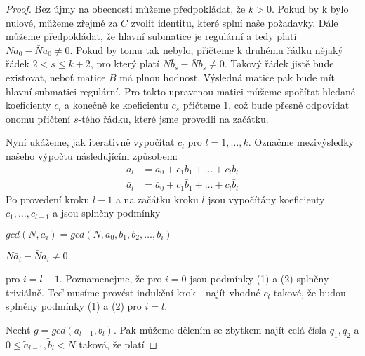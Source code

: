 \begin{proof}
Bez újmy na obecnosti můžeme předpokládat, že $ k > 0 $. Pokud by k bylo nulové,
můžeme zřejmě za $ C $ zvolit identitu, které splní naše požadavky.
Dále můžeme předpokládat, že hlavní submatice je regulární a tedy platí
$ N \bar{a}_0 - \bar{N} a_0 \neq 0 $. Pokud by tomu tak nebylo, přičteme k druhému
řádku nějaký řádek $ 2 < s \leq k + 2 $, pro který platí
$ N \bar{b}_s - \bar{N} b_s \neq 0 $.
Takový řádek jistě bude existovat, neboť matice $ B $ má plnou hodnost. Výsledná
matice pak bude mít hlavní submatici regulární. Pro takto upravenou matici můžeme
spočítat hledané koeficienty $ c_i $ a konečně ke koeficientu $ c_s $ přičteme $ 1 $,
což bude přesně odpovídat onomu přičtení $ s $-tého řádku, které jsme provedli na
začátku.

Nyní ukážeme, jak iterativně vypočítat $ c_l $ pro $ l = 1,\dots,k $. Označme
mezivýsledky našeho výpočtu následujícím způsobem:
\begin{equation}\label{oznac}
    \begin{split}
        a_l &= a_0 + c_1 b_1 + \dots + c_l b_l \\
        \bar{a}_l &= \bar{a}_0 + c_1 \bar{b}_1 +\dots+c_l \bar{b}_l
    \end{split}
\end{equation}
Po provedení kroku $ l-1 $ a na začátku kroku $ l $ jsou vypočítány koeficienty
$ c_1, \dots, c_{l-1} $ a jsou splněny podmínky
\begin{center}
    \begin{CondNum}
        \item $ gcd(N, a_i) = gcd(N, a_0, b_1, b_2, \dots, b_i) $
        \item $ N \bar{a}_i - \bar{N} a_i \neq 0 $
    \end{CondNum}
\end{center}
pro $ i = l - 1 $. Poznamenejme, že pro $ i = 0 $ jsou podmínky (1)
a (2) splněny triviálně. Teď musíme provést
indukční krok - najít vhodné $ c_l $ takové, že budou splněny podmínky
(1) a (2) pro $ i = l $.

Nechť $ g = gcd(a_{l-1}, b_l) $. Pak můžeme dělením se zbytkem najít celá
čísla $ q_1, q_2 $ a
$ 0 \leq \tilde{a}_{l-1}, \tilde{b}_{l} < N $ taková, že platí


\end{proof}
